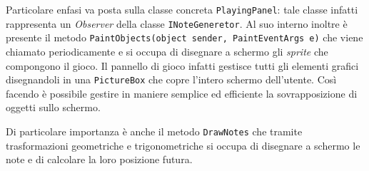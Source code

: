 \vspace{0.5cm}
Particolare enfasi va posta sulla classe concreta \texttt{PlayingPanel}: tale classe infatti rappresenta un \emph{Observer} della classe \texttt{INoteGeneretor}.
Al suo interno inoltre è presente il metodo \texttt{PaintObjects(object sender, PaintEventArgs e)} che viene chiamato periodicamente e si occupa di disegnare a schermo gli \emph{sprite} che compongono il gioco.
Il pannello di gioco infatti gestisce tutti gli elementi grafici disegnandoli in una \texttt{PictureBox} che copre l'intero schermo dell'utente. Così facendo è possibile gestire in maniere semplice ed efficiente la sovrapposizione di oggetti sullo schermo.

Di particolare importanza è anche il metodo \texttt{DrawNotes} che tramite trasformazioni geometriche e trigonometriche si occupa di disegnare a schermo le note e di calcolare la loro posizione futura.